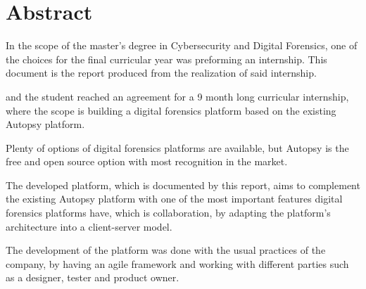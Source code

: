 \chapter*{Abstract}

In the scope of the master's degree in Cybersecurity and Digital Forensics, one of the choices for the final curricular year was preforming an internship. 
This document is the report produced from the realization of said internship.

\company \space and the student reached an agreement for a 9 month long curricular internship, where the scope is building a digital forensics platform based on the existing Autopsy platform.

Plenty of options of digital forensics platforms are available, but Autopsy is the free and open source option with most recognition in the market.

The developed platform, which is documented by this report, aims to complement the existing Autopsy platform with one of the most important features digital forensics platforms have, 
which is collaboration, by adapting the platform's architecture into a client-server model.

The development of the platform was done with the usual practices of the company, by having an agile framework and working with different parties such as a designer, tester and product owner.

\bigskip


\endgroup           
